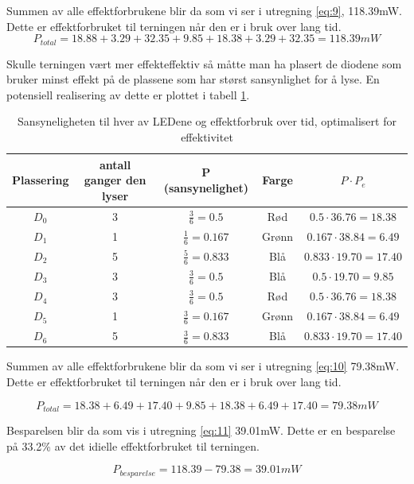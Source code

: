 Summen av alle effektforbrukene blir da som vi ser i utregning \ref{eq:9}, 118.39mW. Dette er effektforbruket til terningen når den er i bruk over lang tid.
\begin{equation}
  P_{total} = 18.88 + 3.29 + 32.35 + 9.85 + 18.38 + 3.29 + 32.35 = 118.39 mW
  \label{eq:9}
\end{equation}

Skulle terningen vært mer effekteffektiv så måtte man ha plasert de diodene som bruker minst effekt på de plassene som har størst sansynlighet for å lyse. En potensiell realisering av dette er plottet i tabell \ref{table:tab5}.

\begin{table}[!h]
  \centering
  \caption{Sansyneligheten til hver av LEDene og effektforbruk over tid, optimalisert for effektivitet}
  \begin{tabular}[!h]{ |c|c|c|c|c| }
    \hline
    Plassering & antall ganger den lyser & P (sansynelighet) & Farge & $P \cdot P_e $  \\
    \hline
    $D_0$ & 3 & $\frac{3}{6} = 0.5$ & Rød & $0.5 \cdot 36.76 = 18.38$\\
    \hline
    $D_1$ & 1 & $\frac{1}{6} = 0.167$ & Grønn & $0.167 \cdot 38.84 = 6.49$\\
    \hline
    $D_2$ & 5 & $\frac{5}{6} = 0.833$ & Blå & $0.833 \cdot 19.70 = 17.40$\\
    \hline
    $D_3$ & 3 & $\frac{3}{6} = 0.5$ & Blå & $0.5 \cdot 19.70 = 9.85$\\
    \hline
    $D_4$ & 3 & $\frac{3}{6} = 0.5$ & Rød & $0.5 \cdot 36.76 = 18.38$\\
    \hline
    $D_5$ & 1 & $\frac{3}{6} = 0.167$ & Grønn & $0.167 \cdot 38.84 = 6.49$\\
    \hline
    $D_6$ & 5 & $\frac{3}{6} = 0.833$ & Blå & $0.833 \cdot 19.70 = 17.40$\\
    \hline
  \end{tabular}
  \label{table:tab5}
\end{table}

Summen av alle effektforbrukene blir da som vi ser i utregning \ref{eq:10} 79.38mW. Dette er effektforbruket til terningen når den er i bruk over lang tid.

\begin{equation}
  P_{total} = 18.38 + 6.49 + 17.40 + 9.85 + 18.38 + 6.49 + 17.40 = 79.38 mW
  \label{eq:10}
\end{equation}

Besparelsen blir da som vis i utregning \ref{eq:11} 39.01mW. Dette er en besparelse på 33.2\% av det idielle effektforbruket til terningen.

\begin{equation}
  P_{besparelse} = 118.39 - 79.38 = 39.01 mW
  \label{eq:11}
\end{equation}


